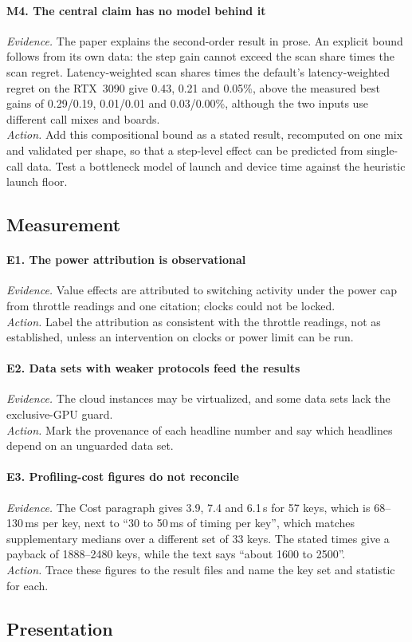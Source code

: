 \documentclass[11pt]{article}
\newcommand{\finding}[2]{\paragraph{#1. #2}}
\newcommand{\evidence}{\textit{Evidence.} }
\newcommand{\action}{\textit{Action.} }
\begin{document}
\finding{M4}{The central claim has no model behind it}
\evidence The paper explains the second-order result in prose. An explicit bound follows
from its own data: the step gain cannot exceed the scan share times the scan regret.
Latency-weighted scan shares times the default's latency-weighted regret on the RTX~3090
give 0.43, 0.21 and 0.05\%, above the measured best gains of 0.29/0.19, 0.01/0.01 and
0.03/0.00\%, although the two inputs use different call mixes and boards.\\
\action Add this compositional bound as a stated result, recomputed on one mix and
validated per shape, so that a step-level effect can be predicted from single-call data.
Test a bottleneck model of launch and device time against the heuristic launch floor.

\subsection*{Measurement}

\finding{E1}{The power attribution is observational}
\evidence Value effects are attributed to switching activity under the power cap from
throttle readings and one citation; clocks could not be locked.\\
\action Label the attribution as consistent with the throttle readings, not as
established, unless an intervention on clocks or power limit can be run.

\finding{E2}{Data sets with weaker protocols feed the results}
\evidence The cloud instances may be virtualized, and some data sets lack the exclusive-GPU
guard.\\
\action Mark the provenance of each headline number and say which headlines depend on an
unguarded data set.

\finding{E3}{Profiling-cost figures do not reconcile}
\evidence The Cost paragraph gives 3.9, 7.4 and 6.1\,s for 57 keys, which is 68--130\,ms per
key, next to ``30 to 50\,ms of timing per key'', which matches supplementary medians over a
different set of 33 keys. The stated times give a payback of 1888--2480 keys, while the text
says ``about 1600 to 2500''.\\
\action Trace these figures to the result files and name the key set and statistic for each.

\subsection*{Presentation}
\end{document}
